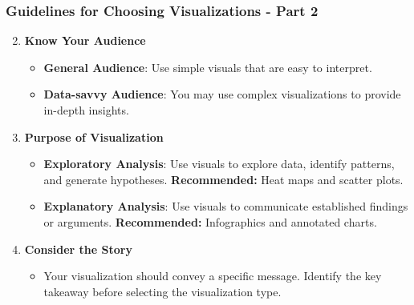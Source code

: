 \documentclass{beamer}
\begin{document}
\begin{frame}[fragile]
    \frametitle{Guidelines for Choosing Visualizations - Part 2}
    \begin{enumerate}
        \setcounter{enumi}{1} %
        \item \textbf{Know Your Audience}
            \begin{itemize}
                \item \textbf{General Audience}: Use simple visuals that are easy to interpret.
                \item \textbf{Data-savvy Audience}: You may use complex visualizations to provide in-depth insights.
            \end{itemize}
        \item \textbf{Purpose of Visualization}
            \begin{itemize}
                \item \textbf{Exploratory Analysis}: Use visuals to explore data, identify patterns, and generate hypotheses. \textbf{Recommended:} Heat maps and scatter plots.
                \item \textbf{Explanatory Analysis}: Use visuals to communicate established findings or arguments. \textbf{Recommended:} Infographics and annotated charts.
            \end{itemize}
        \item \textbf{Consider the Story}
            \begin{itemize}
                \item Your visualization should convey a specific message. Identify the key takeaway before selecting the visualization type.
            \end{itemize}
    \end{enumerate}
\end{frame}
\end{document}
